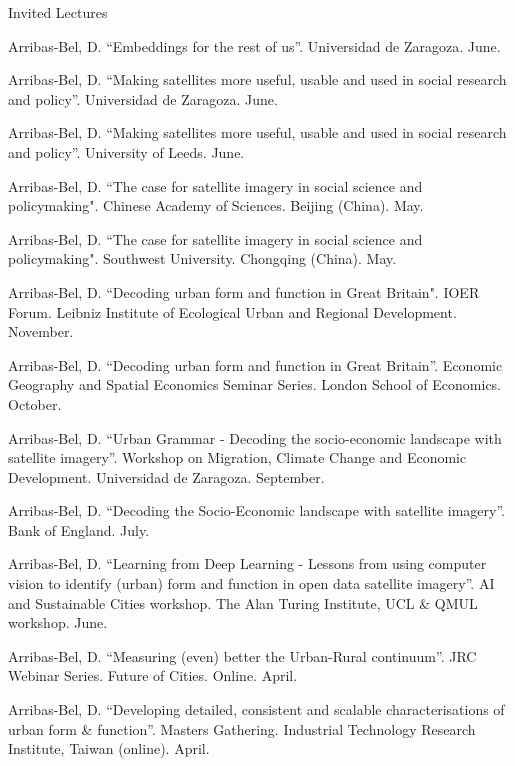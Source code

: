 \documentclass[12pt,2up]{article}
\begin{document}
\begin{cv}{}
\begin{cvlist}{Invited Lectures}
\item[\textbf{Seminars}]
\item[2026] Arribas-Bel, D. ``Embeddings for the rest of us''.
        Universidad de Zaragoza. June.
\item[] Arribas-Bel, D. ``Making satellites more useful, usable and used
        in social research and policy''.
        Universidad de Zaragoza. June.
\item[] Arribas-Bel, D. ``Making satellites more useful, usable and used
        in social research and policy''. University of Leeds. June.
\item[2025] Arribas-Bel, D. ``The case for satellite imagery in social science
        and policymaking". Chinese Academy of Sciences. Beijing (China). May.
\item[] Arribas-Bel, D. ``The case for satellite imagery in social science
        and policymaking". Southwest University. Chongqing (China). May.
\item[2023] Arribas-Bel, D. ``Decoding urban form and function in Great Britain".
        IOER Forum. Leibniz Institute of Ecological Urban and Regional Development.
        November.
\item[] Arribas-Bel, D. ``Decoding urban form and function in Great
        Britain''. Economic Geography and Spatial Economics Seminar Series.
        London School of Economics. October.
\item[] Arribas-Bel, D. ``Urban Grammar - Decoding the socio-economic
        landscape with satellite imagery''. Workshop on Migration, Climate
        Change and Economic Development. Universidad de Zaragoza. September.
\item[] Arribas-Bel, D. ``Decoding the Socio-Economic landscape with
        satellite imagery''. Bank of England. July.
\item[] Arribas-Bel, D. ``Learning from Deep Learning - Lessons from using
        computer vision to identify (urban) form and function in open data
        satellite imagery''. AI and Sustainable Cities workshop. The Alan
        Turing Institute, UCL \& QMUL workshop. June.
\item[] Arribas-Bel, D. ``Measuring (even) better the Urban-Rural
        continuum''. JRC Webinar Series. Future of Cities. Online. April.
\item[] Arribas-Bel, D. ``Developing detailed, consistent and scalable
        characterisations of urban form \& function''. Masters Gathering.
        Industrial Technology Research Institute, Taiwan (online). April.

\end{cvlist}
\end{cv}
\end{document}
